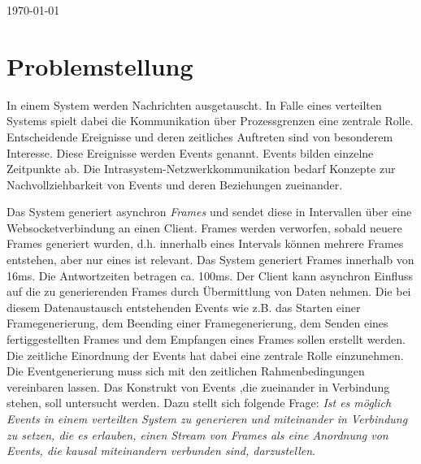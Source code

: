 \documentclass[a4paper]{article}
\begin{document}
\begin{titlepage}
	
	\vfill\vfill\vfill %
	
	{\large \today} %
	
	
	\vfill\vfill
	
	
	\vfill %
	
\end{titlepage}

\tableofcontents
\newpage
{}

\section{Problemstellung}
\label{section:Problemstellung}
	In einem System werden Nachrichten ausgetauscht. In Falle eines verteilten Systems spielt dabei die Kommunikation über Prozessgrenzen eine zentrale Rolle.
	Entscheidende Ereignisse und deren zeitliches Auftreten sind von besonderem Interesse. Diese Ereignisse werden Events genannt. Events bilden einzelne Zeitpunkte ab. Die Intrasystem-Netzwerkkommunikation bedarf Konzepte zur Nachvollziehbarkeit von Events und deren Beziehungen zueinander. 
	
	Das System generiert asynchron \emph{Frames} und sendet diese in Intervallen über eine Websocketverbindung an einen Client. Frames werden verworfen, sobald neuere Frames generiert wurden, d.h. innerhalb eines Intervals können mehrere Frames entstehen, aber nur eines ist relevant. Das System generiert Frames innerhalb von 16ms. Die Antwortzeiten betragen ca. 100ms. Der Client kann asynchron Einfluss auf die zu generierenden Frames durch Übermittlung von Daten nehmen. Die bei diesem Datenaustausch entstehenden Events wie z.B. das Starten einer Framegenerierung, dem Beending einer Framegenerierung, dem Senden eines fertiggestellten Frames und dem Empfangen eines Frames sollen erstellt werden. Die zeitliche Einordnung der Events hat dabei eine zentrale Rolle einzunehmen. Die Eventgenerierung muss sich mit den zeitlichen Rahmenbedingungen vereinbaren lassen. Das Konstrukt von Events ,die zueinander in Verbindung stehen, soll untersucht werden. Dazu stellt sich folgende Frage: \emph{Ist es möglich Events in einem verteilten System zu generieren und miteinander in Verbindung zu setzen, die es erlauben, einen Stream von Frames als eine Anordnung von Events, die kausal miteinandern verbunden sind, darzustellen}.
\end{document}

